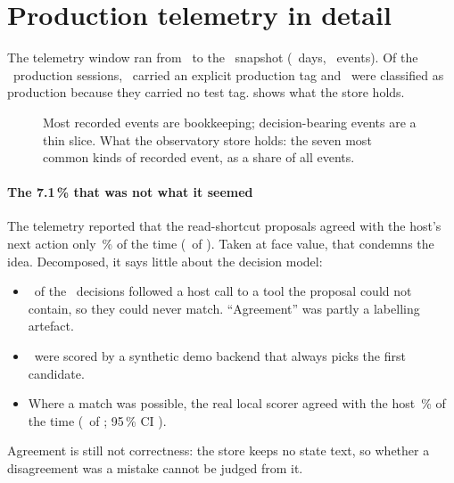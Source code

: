 \section{Production telemetry in detail}\label{sec:telemetrydetail}

The telemetry window ran from \ObWeekStart\ to the \ObCutoff\ snapshot (\ObDays\ days, \ObEvents\ events). Of the
\ObProdSessions\ production sessions, \ObProdTagged\ carried an explicit production tag and \ObProdDefault\ were
classified as production because they carried no test tag.  shows what the store holds.

\begin{figure}[tbp]
\centering
{}\par\smallskip

\caption{Most recorded events are bookkeeping; decision-bearing events are a thin slice. What the observatory store holds: the seven most common kinds of recorded event, as a share of all events.}
\label{fig:obsmix}
\end{figure}

\paragraph{The 7.1\,\% that was not what it seemed} The telemetry reported that the read-shortcut proposals agreed
with the host's next action only \ObAllRate\,\% of the time (\ObAllMatch\ of \ObAllN). Taken at face value, that
condemns the idea. Decomposed, it says little about the decision model:
\begin{itemize}
  \item \ObUnmatchN\ of the \ObAllN\ decisions followed a host call to a tool the proposal could not contain, so they
    could never match. ``Agreement'' was partly a labelling artefact.
  \item \ObDemoN\ were scored by a synthetic demo backend that always picks the first candidate.
  \item Where a match was possible, the real local scorer agreed with the host \ObCandRate\,\% of the time
    (\ObCandMatch\ of \ObCandN; 95\,\% CI \ObCandCI).
\end{itemize}
Agreement is still not correctness: the store keeps no state text, so whether a disagreement was a mistake cannot be
judged from it.

